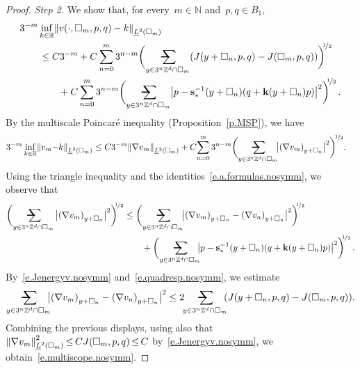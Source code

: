 \documentclass[11pt,twoside]{article} %
\makeatletter
\let\oldsquare\square %
\renewcommand{\square}{\oldsquare}
\numberwithin{equation}{section}
\theoremstyle{definition}
\let\originalleft\left
\let\originalright\right
\renewcommand{\left}{\mathopen{}\mathclose\bgroup\originalleft}
\renewcommand{\right}{\aftergroup\egroup\originalright}
\newcommand*{\N}{\ensuremath{\mathbb{N}}}
\newcommand*{\R}{\ensuremath{\mathbb{R}}}
\newcommand*{\Zd}{\ensuremath{\mathbb{Z}^d}}
\newcommand{\s}{\mathbf{s}}
\renewcommand{\k}{\mathbf{k}}
\newcommand{\cu}{\square}
\newcommand{\avsum}{\mathop{\mathpalette\avsuminner\relax}\displaylimits}
\newcommand\avsuminner[2]{%
  {\sbox0{$\m@th#1\sum$}%
   \vphantom{\usebox0}%
   \ooalign{%
     \hidewidth
     \smash{\,\rule[.23em]{8.8pt}{1.1pt} \relax}%
     \hidewidth\cr
   ~$\m@th#1\sum$\cr
   }%
  }%
}
\makeatother
\begin{document}
\begin{proof}
\emph{Step 2.} We show that,
for every~$m\in\N$ and~$p,q\in B_1$, 
\begin{align}
\label{e.multiscope.nosymm}
\lefteqn{
3^{-m} 
\inf_{k\in\R} 
\left\| v(\cdot,\cu_m,p,q) - k \right\|_{\underline{L}^2(\cu_m)} 
} \qquad & 
\notag \\ &
\leq
C3^{-m} 
+
C
\sum_{n=0}^{{m}} 3^{n-m} 
\biggl(
\avsum_{y\in 3^{n}\Zd\cap \cu_m} 
( J(y+\cu_{n},p,q) - J (\cu_m,p,q) )
\biggr)^{\!\!\nicefrac12}
\notag \\ & \qquad 
+
C\sum_{n=0}^{{m}} 3^{n-m} 
\biggl(\avsum_{y\in 3^n\Zd\cap \cu_{m}} 
\left| p -\s_*^{-1}(y+\cu_n) (q +\k(y+\cu_n)p ) \right|^2
\biggr)^{\!\!\nicefrac12}
\,.
\end{align}
By the multiscale Poincar\'e inequality (Proposition~\ref{p.MSP}), we have
\begin{align*}
3^{-m} 
\inf_{k\in\R} 
\left\| v_m {-} k \right\|_{\underline{L}^2(\cu_m)} 
&
\leq 
C3^{-m} \left\| \nabla v_m \right\|_{\underline{L}^2(\cu_m)} 
+
C \! 
\sum_{n=0}^{m} 3^{n-m} 
\biggl( \avsum_{y\in 3^n\Zd\cap \cu_{m}} \!\!
\big| \left( \nabla v_m \right)_{y+\cu_n} \big|^2 \biggr)^{\!\nicefrac12}
.
\end{align*}
Using the triangle inequality and the identities~\eqref{e.a.formulas.nosymm}, we observe that 
\begin{align*}
\biggl(
\avsum_{y\in 3^n\Zd\cap \cu_{m}} 
\big| \left( \nabla v_m \right)_{y+\cu_n} \big|^2\biggr)^{\!\!\nicefrac12}
&
\leq 
\biggl(\avsum_{y\in 3^n\Zd\cap \cu_{m}} \!\!
\big|  \left( \nabla v_{m} \right)_{y+\cu_n} -  \left( \nabla v_{n} \right)_{y+\cu_n} \big|^2\biggr)^{\!\!\nicefrac12}
\notag \\ & \qquad 
+
\biggl(\avsum_{y\in 3^n\Zd\cap \cu_{m}} \!\!
\left| p -\s_*^{-1}(y+\cu_n) (q +\k(y+\cu_n)p ) \right|^2
\biggr)^{\!\!\nicefrac12}
\,.
\end{align*}
By~\eqref{e.Jenergyv.nosymm} and~\eqref{e.quadresp.nosymm}, we estimate
\begin{align*}
\avsum_{y\in 3^n\Zd\cap \cu_{m}} \!\!\!
\big|  \left( \nabla v_{m} \right)_{y+\cu_n}  - \left( \nabla v_{n} \right)_{y+\cu_n} \big|^2
\leq 
2 \!\!
\avsum_{y\in 3^{n}\Zd\cap \cu_m} \!\!
( J(y+\cu_{n},p,q) - J (\cu_m,p,q) )
.
\end{align*}
Combining the previous displays, using also that~$\left\| \nabla v_m \right\|_{\underline{L}^2(\cu_m)}^2  \hspace{-1pt}  \leq \hspace{-1pt} CJ(\cu_m,p,q) \hspace{-1pt} \leq \hspace{-1pt} C$ by~\eqref{e.Jenergyv.nosymm}, we obtain~\eqref{e.multiscope.nosymm}.



\end{proof}
\end{document}
